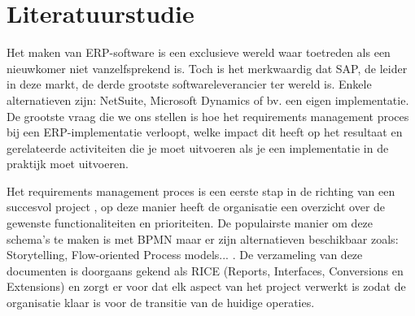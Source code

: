 
\chapter{Literatuurstudie}
\label{ch:literatuurstudie}

Het maken van ERP-software is een exclusieve wereld waar toetreden als een nieuwkomer niet vanzelfsprekend is. Toch is het merkwaardig dat SAP, de leider in deze markt, de derde grootste softwareleverancier ter wereld is. Enkele alternatieven zijn: NetSuite, Microsoft Dynamics of bv. een eigen implementatie.
De grootste vraag die we ons stellen is hoe het requirements management proces bij een ERP-implementatie verloopt, welke impact dit heeft op het resultaat en gerelateerde activiteiten die je moet uitvoeren als je een implementatie in de praktijk moet uitvoeren. 

Het requirements management proces is een eerste stap in de richting van een succesvol project \autocite{Williamson2018}, op deze manier heeft de organisatie een overzicht over de gewenste functionaliteiten en prioriteiten. De populairste manier om deze schema's te maken is met BPMN maar er zijn alternatieven beschikbaar zoals: Storytelling, Flow-oriented Process models... \autocite{Lillehagen2009}. De verzameling van deze documenten is doorgaans gekend als RICE (Reports, Interfaces, Conversions en Extensions) \autocite{Williamson2018} en zorgt er voor dat elk aspect van het project verwerkt is zodat de organisatie klaar is voor de transitie van de huidige operaties. 

